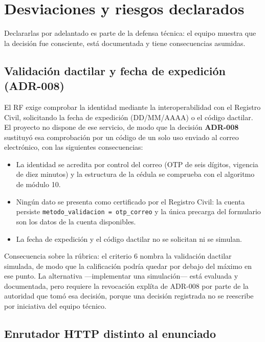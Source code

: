 \documentclass[11pt,a4paper]{article}
\newcommand{\ent}[1]{\textsf{\textbf{#1}}}
\newcommand{\code}[1]{\texttt{#1}}
\begin{document}
\section{Desviaciones y riesgos declarados}\label{sec:desviaciones}

Declararlas por adelantado es parte de la defensa t\'ecnica: el equipo muestra que la decisi\'on fue
consciente, est\'a documentada y tiene consecuencias asumidas.

\subsection{Validaci\'on dactilar y fecha de expedici\'on (ADR-008)}

El RF exige comprobar la identidad mediante la interoperabilidad con el Registro Civil, solicitando la
fecha de expedici\'on (DD/MM/AAAA) o el c\'odigo dactilar. El proyecto no dispone de ese servicio, de modo
que la decisi\'on \ent{ADR-008} sustituy\'o esa comprobaci\'on por un c\'odigo de un solo uso enviado al
correo electr\'onico, con las siguientes consecuencias:

\begin{itemize}
  \item La identidad se acredita por control del correo (OTP de seis d\'igitos, vigencia de diez minutos) y
        la estructura de la c\'edula se comprueba con el algoritmo de m\'odulo 10.
  \item Ning\'un dato se presenta como certificado por el Registro Civil: la cuenta persiste
        \code{metodo\_validacion = otp\_correo} y la \'unica precarga del formulario son los datos de la
        cuenta disponibles.
  \item La fecha de expedici\'on y el c\'odigo dactilar no se solicitan ni se simulan.
\end{itemize}

Consecuencia sobre la r\'ubrica: el criterio 6 nombra la validaci\'on dactilar simulada, de modo que la
calificaci\'on podr\'ia quedar por debajo del m\'aximo en ese punto. La alternativa ---implementar una
simulaci\'on--- est\'a evaluada y documentada, pero requiere la revocaci\'on expl\'ita de ADR-008 por parte
de la autoridad que tom\'o esa decisi\'on, porque una decisi\'on registrada no se reescribe por iniciativa
del equipo t\'ecnico.

\subsection{Enrutador HTTP distinto al enunciado}
\end{document}
